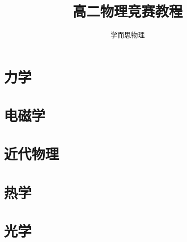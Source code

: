\documentclass[krantz1,ChapterTOCs]{krantz}
\begin{document}
\frontmatter

\title{高二物理竞赛教程}
\author{学而思物理}

\maketitle

%
\tableofcontents
%
%
\listoffigures
\listoftables
%
%

\mainmatter

\part{力学}



\part{电磁学}

\part{近代物理}

\part{热学}

\part{光学}






\printindex
\end{document}
